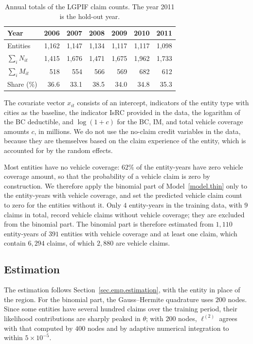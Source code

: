 \begin{table}[htbp]
\centering
\caption{Annual totals of the LGPIF claim counts. The year 2011 is the
hold-out year.}
\label{tab.lgpif.year}
\small
\begin{tabular}{lrrrrrr}
\toprule
Year & 2006 & 2007 & 2008 & 2009 & 2010 & 2011\\
\midrule
Entities & 1{,}162 & 1{,}147 & 1{,}134 & 1{,}117 & 1{,}117 & 1{,}098\\
\(\sum_i N_{it}\) & 1{,}415 & 1{,}676 & 1{,}471 & 1{,}675 & 1{,}962 & 1{,}733\\
\(\sum_i M_{it}\) & 518 & 554 & 566 & 569 & 682 & 612\\
Share (\%) & 36.6 & 33.1 & 38.5 & 34.0 & 34.8 & 35.3\\
\bottomrule
\end{tabular}
\end{table}

The covariate vector \(x_{it}\) consists of an intercept, indicators of
the entity type with cities as the baseline, the indicator IsRC
provided in the data, the logarithm of the BC deductible, and
\(\log(1+c)\) for the BC, IM, and total vehicle coverage amounts \(c\), in
millions. We do not use the no-claim credit variables in the data,
because they are themselves based on the claim experience of the entity,
which is accounted for by the random effects.

Most entities have no vehicle coverage: \(62\%\) of the entity-years have
zero vehicle coverage amount, so that the probability of a vehicle claim
is zero by construction. We therefore apply the binomial part of
Model~\ref{model.thin} only to the entity-years with vehicle coverage,
and set the predicted vehicle claim count to zero for the entities
without it. Only \(4\) entity-years in the training data, with \(9\)
claims in total, record vehicle claims without vehicle coverage; they
are excluded from the binomial part. The binomial part is therefore
estimated from \(1{,}110\) entity-years of \(391\) entities with vehicle
coverage and at least one claim, which contain \(6{,}294\) claims, of
which \(2{,}880\) are vehicle claims.

\subsection{Estimation}
\label{sec.lgpif.estimation}

The estimation follows Section~\ref{sec.emp.estimation}, with the entity
in place of the region. For the binomial part, the Gauss--Hermite
quadrature uses \(200\) nodes. Since some entities have several hundred
claims over the training period, their likelihood contributions are
sharply peaked in \(\theta\); with \(200\) nodes, \(\ell^{(2)}\) agrees
with that computed by \(400\) nodes and by adaptive numerical
integration to within \(5\times10^{-5}\).

